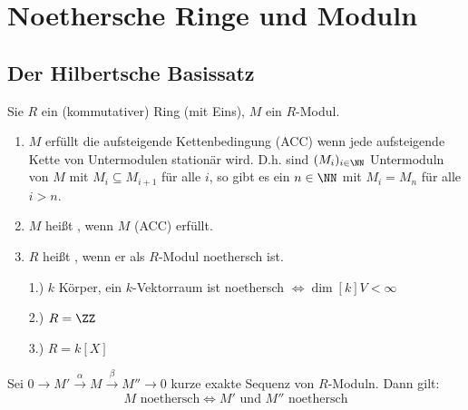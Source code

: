\chapter{Noethersche Ringe und Moduln}

\section{Der Hilbertsche Basissatz}

\begin{Def}
  Sie $R$ ein (kommutativer) Ring (mit Eins), $M$ ein $R$-Modul.
  \begin{enumerate}
    \item $M$ erfüllt die aufsteigende Kettenbedingung (ACC) wenn jede
          aufsteigende Kette von Untermodulen stationär wird. D.h. sind
          $(M_i)_{i \in \NN}$ Untermoduln von $M$ mit $M_i \subseteq 
          M_{i+1}$ für alle $i$, so gibt es ein $n \in \NN$ mit $M_i =
          M_n$ für alle $i > n$.
    \item $M$ heißt , wenn $M$ (ACC) erfüllt.
    \item $R$ heißt , wenn er als $R$-Modul noethersch ist.
\end{enumerate}
\end{Def}

\begin{nnBsp}
  \begin{enumerate}
    \item[1.)] $k$ Körper, ein $k$-Vektorraum ist noethersch $\Leftrightarrow
                 \dim[k]{V} < \infty$
    \item[2.)] $R = \ZZ$
    \item[3.)] $R = k[X]$
  \end{enumerate}
\end{nnBsp}

\begin{Bem}
\label{2.2}
  Sei $0 \to M' \overset{\alpha}{\to} M \overset{\beta}{\to} M'' \to 0$ kurze
  exakte Sequenz von $R$-Moduln. Dann gilt:
  \[M \text{ noethersch} \Leftrightarrow M' \text{ und } M'' \text{ noethersch}\]
\end{Bem}

